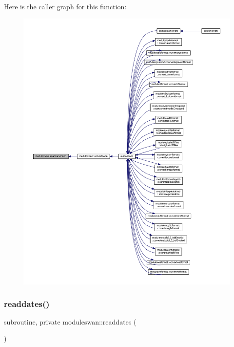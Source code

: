 Here is the caller graph for this function\+:\nopagebreak
\begin{figure}[H]
\begin{center}
\leavevmode
\includegraphics[width=350pt]{namespacemoduleswan_ad7b64582ddb44426de0dd83c9c0b9b42_icgraph}
\end{center}
\end{figure}
\mbox{\label{namespacemoduleswan_a21f8abfb6ba4a1cd70fcffe134d3cc55}} 
\subsubsection{\texorpdfstring{readdates()}{readdates()}}
{\footnotesize\ttfamily subroutine, private moduleswan\+::readdates (\begin{DoxyParamCaption}{ }\end{DoxyParamCaption})\hspace{0.3cm}{\ttfamily [private]}}

